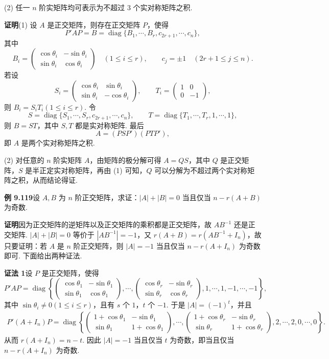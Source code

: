 \documentclass[UTF8,12pt,a4paper,fontset=fandol]{ctexart}
\begin{document}
(2) 任一 $n$ 阶实矩阵均可表示为不超过 $3$ 个实对称矩阵之积.

\noindent\textbf{证明}\quad (1) 设 $A$ 是正交矩阵，则存在正交矩阵 $P$，使得
\[
P'AP=B=\operatorname{diag}\{B_1,\cdots,B_r,c_{2r+1},\cdots,c_n\},
\]
其中
\[
B_i=\begin{pmatrix}
\cos\theta_i&-\sin\theta_i\\
\sin\theta_i&\cos\theta_i
\end{pmatrix}\quad (1\le i\le r),\qquad c_j=\pm1\quad (2r+1\le j\le n).
\]
若设
\[
S_i=\begin{pmatrix}
\cos\theta_i&\sin\theta_i\\
\sin\theta_i&-\cos\theta_i
\end{pmatrix},\qquad
T_i=\begin{pmatrix}
1&0\\
0&-1
\end{pmatrix},
\]
则 $B_i=S_iT_i(1\le i\le r)$. 令
\[
S=\operatorname{diag}\{S_1,\cdots,S_r,c_{2r+1},\cdots,c_n\},\qquad
T=\operatorname{diag}\{T_1,\cdots,T_r,1,\cdots,1\},
\]
则 $B=ST$，其中 $S,T$ 都是实对称矩阵. 最后
\[
A=(PSP')(PTP'),
\]
即 $A$ 是两个实对称矩阵之积.

(2) 对任意的 $n$ 阶实矩阵 $A$，由矩阵的极分解可得 $A=QS$，其中 $Q$ 是正交矩阵，$S$ 是半正定实对称矩阵，再由 (1) 可知，$Q$ 可以分解为不超过两个实对称矩阵之积，从而结论得证.

\noindent\textbf{例 9.119}\quad 设 $A,B$ 为 $n$ 阶正交矩阵，求证：$|A|+|B|=0$ 当且仅当 $n-r(A+B)$ 为奇数.

\noindent\textbf{证明}\quad 因为正交矩阵的逆矩阵以及正交矩阵的乘积都是正交矩阵，故 $AB^{-1}$ 还是正交矩阵. $|A|+|B|=0$ 等价于 $|AB^{-1}|=-1$，又 $r(A+B)=r(AB^{-1}+I_n)$，故只要证明：若 $A$ 是 $n$ 阶正交矩阵，则 $|A|=-1$ 当且仅当 $n-r(A+I_n)$ 为奇数即可. 下面给出两种证法.

\noindent\textbf{证法 1}\quad 设 $P$ 是正交矩阵，使得
\[
P'AP=\operatorname{diag}\left\{
\begin{pmatrix}
\cos\theta_1&-\sin\theta_1\\
\sin\theta_1&\cos\theta_1
\end{pmatrix},\cdots,
\begin{pmatrix}
\cos\theta_r&-\sin\theta_r\\
\sin\theta_r&\cos\theta_r
\end{pmatrix},
1,\cdots,1,-1,\cdots,-1
\right\},
\]
其中 $\sin\theta_i\ne0(1\le i\le r)$，且有 $s$ 个 $1$，$t$ 个 $-1$. 于是 $|A|=(-1)^t$，并且
\[
\begin{aligned}
P'(A+I_n)P
=\operatorname{diag}\left\{
\begin{pmatrix}
1+\cos\theta_1&-\sin\theta_1\\
\sin\theta_1&1+\cos\theta_1
\end{pmatrix},\cdots,
\begin{pmatrix}
1+\cos\theta_r&-\sin\theta_r\\
\sin\theta_r&1+\cos\theta_r
\end{pmatrix},
2,\cdots,2,0,\cdots,0
\right\}.
\end{aligned}
\]
从而 $r(A+I_n)=n-t$. 因此 $|A|=-1$ 当且仅当 $t$ 为奇数，即当且仅当 $n-r(A+I_n)$ 为奇数.
\end{document}
